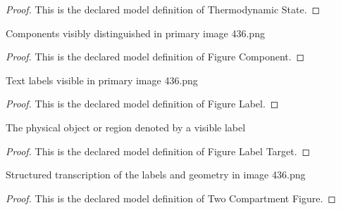 \begin{proof}
  This is the declared model definition of Thermodynamic State.
\end{proof}
\begin{definition}
  \label{def:physics:phyx-mini-0436:phyxminiproblems-problemphyxmini0436-figurecomponent}
  Components visibly distinguished in primary image 436.png
\end{definition}
\begin{proof}
  This is the declared model definition of Figure Component.
\end{proof}
\begin{definition}
  \label{def:physics:phyx-mini-0436:phyxminiproblems-problemphyxmini0436-figurelabel}
  Text labels visible in primary image 436.png
\end{definition}
\begin{proof}
  This is the declared model definition of Figure Label.
\end{proof}
\begin{definition}
  \label{def:physics:phyx-mini-0436:phyxminiproblems-problemphyxmini0436-figurelabeltarget}
  The physical object or region denoted by a visible label
\end{definition}
\begin{proof}
  This is the declared model definition of Figure Label Target.
\end{proof}
\begin{definition}
  \label{def:physics:phyx-mini-0436:phyxminiproblems-problemphyxmini0436-twocompartmentfigure}
  Structured transcription of the labels and geometry in image 436.png
\end{definition}
\begin{proof}
  This is the declared model definition of Two Compartment Figure.
\end{proof}
